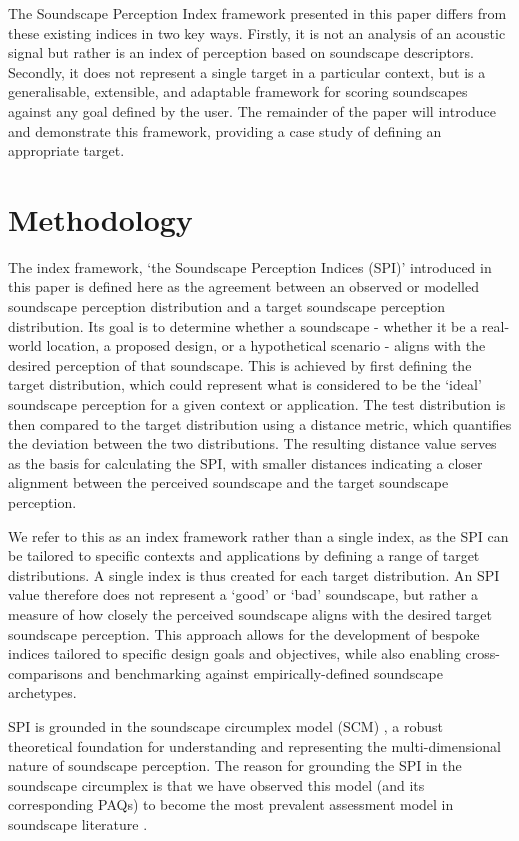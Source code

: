 \documentclass[
  authoryear,
  preprint,
  3p]{elsarticle}
\begin{document}
The Soundscape Perception Index framework presented in this paper
differs from these existing indices in two key ways. Firstly, it is not
an analysis of an acoustic signal but rather is an index of perception
based on soundscape descriptors. Secondly, it does not represent a
single target in a particular context, but is a generalisable,
extensible, and adaptable framework for scoring soundscapes against any
goal defined by the user. The remainder of the paper will introduce and
demonstrate this framework, providing a case study of defining an
appropriate target.

\section{Methodology}\label{sec-method}

The index framework, `the Soundscape Perception Indices (SPI)'
introduced in this paper is defined here as the agreement between an
observed or modelled soundscape perception distribution and a target
soundscape perception distribution. Its goal is to determine whether a
soundscape - whether it be a real-world location, a proposed design, or
a hypothetical scenario - aligns with the desired perception of that
soundscape. This is achieved by first defining the target distribution,
which could represent what is considered to be the `ideal' soundscape
perception for a given context or application. The test distribution is
then compared to the target distribution using a distance metric, which
quantifies the deviation between the two distributions. The resulting
distance value serves as the basis for calculating the SPI, with smaller
distances indicating a closer alignment between the perceived soundscape
and the target soundscape perception.

We refer to this as an index framework rather than a single index, as
the SPI can be tailored to specific contexts and applications by
defining a range of target distributions. A single index is thus created
for each target distribution. An SPI value therefore does not represent
a `good' or `bad' soundscape, but rather a measure of how closely the
perceived soundscape aligns with the desired target soundscape
perception. This approach allows for the development of bespoke indices
tailored to specific design goals and objectives, while also enabling
cross-comparisons and benchmarking against empirically-defined
soundscape archetypes.

SPI is grounded in the soundscape circumplex model (SCM)
\citep{Axelsson2010principal, Axelsson2012Swedish}, a robust theoretical
foundation for understanding and representing the multi-dimensional
nature of soundscape perception. The reason for grounding the SPI in the
soundscape circumplex is that we have observed this model (and its
corresponding PAQs) to become the most prevalent assessment model in
soundscape literature \citep{Aletta2023Adoption}.
\end{document}
